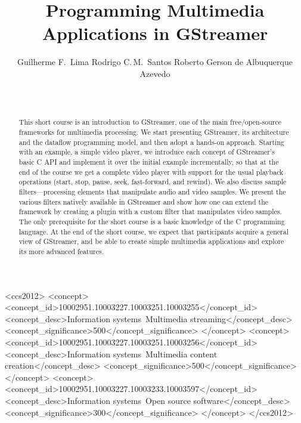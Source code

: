 \documentclass{sig-alternate-05-2015}
\begin{document}
%
%
%
%
%
%
%
\title{Programming Multimedia Applications in GStreamer}
\author{%
\alignauthor
Guilherme F.~Lima\quad
Rodrigo C.\,M.~Santos\quad
Roberto Gerson de Albuquerque Azevedo\\
\\
\\
}
\maketitle
\begin{abstract}
  This short course is an introduction to GStreamer, one of the main
  free/open-source frameworks for multimedia processing.  We start
  presenting GStreamer, its architecture and the dataflow programming model,
  and then adopt a hands-on approach.  Starting with an example, a simple
  video player, we introduce each concept of GStreamer’s basic C API and
  implement it over the initial example incrementally, so that at the end of
  the course we get a complete video player with support for the usual
  playback operations (start, stop, pause, seek, fast-forward, and rewind).
  We also discuss sample filters---processing elements that manipulate audio
  and video samples.  We present the various filters natively available in
  GStreamer and show how one can extend the framework by creating a plugin
  with a custom filter that manipulates video samples.  The only
  prerequisite for the short course is a basic knowledge of the C
  programming language.  At the end of the short course, we expect that
  participants acquire a general view of GStreamer, and be able to create
  simple multimedia applications and explore its more advanced features.
\end{abstract}

 \begin{CCSXML}
<ccs2012>
<concept>
<concept_id>10002951.10003227.10003251.10003255</concept_id>
<concept_desc>Information systems~Multimedia streaming</concept_desc>
<concept_significance>500</concept_significance>
</concept>
<concept>
<concept_id>10002951.10003227.10003251.10003256</concept_id>
<concept_desc>Information systems~Multimedia content creation</concept_desc>
<concept_significance>500</concept_significance>
</concept>
<concept>
<concept_id>10002951.10003227.10003233.10003597</concept_id>
<concept_desc>Information systems~Open source software</concept_desc>
<concept_significance>300</concept_significance>
</concept>
</ccs2012>
\end{CCSXML}
\end{document}
